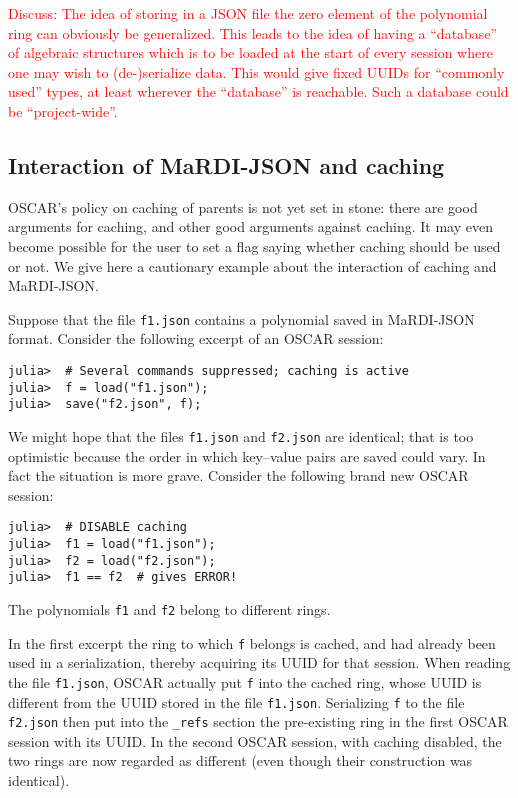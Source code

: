 \documentclass{article}
\newcommand{\MaRDIJSON}{MaRDI-JSON}
\def\red#1{\textcolor{red}{#1}}
\begin{document}
\red{Discuss: The idea of storing in a JSON file the zero element of the
  polynomial ring can obviously be generalized.  This leads to the
  idea of having a ``database'' of algebraic structures which is to be
  loaded at the start of every session where one may wish to
  (de-)serialize data.  This would give fixed UUIDs for
  ``commonly used'' types, at least wherever the ``database'' is
  reachable.  Such a database could be ``project-wide''.}


\subsection{Interaction of {\MaRDIJSON} and caching}
\label{sec:InteractionWithCaching}

OSCAR's policy on caching of parents is not yet set in stone:
there are good arguments for caching, and other good arguments
against caching.  It may even become possible for the user to
set a flag saying whether caching should be used or not.  We
give here a cautionary example about the interaction of caching
and {\MaRDIJSON}.

Suppose that the file \verb|f1.json| contains a polynomial
saved in {\MaRDIJSON} format.  Consider the following excerpt
of an OSCAR session:
\begin{verbatim}
julia>  # Several commands suppressed; caching is active
julia>  f = load("f1.json");
julia>  save("f2.json", f);
\end{verbatim}
We might hope that the files \verb|f1.json| and \verb|f2.json|
are identical; that is too optimistic because the order in which
key--value pairs are saved could vary.  In fact the situation is
more grave.  Consider the following brand new OSCAR session:
\begin{verbatim}
julia>  # DISABLE caching
julia>  f1 = load("f1.json");
julia>  f2 = load("f2.json");
julia>  f1 == f2  # gives ERROR!
\end{verbatim}
The polynomials \verb|f1| and \verb|f2| belong to different rings.

In the first excerpt the ring to which \verb|f| belongs is cached,
and had already been used in a serialization, thereby acquiring its
UUID for that session.  When reading the file \verb|f1.json|,
OSCAR actually put \verb|f| into the cached ring, whose UUID is
different from the UUID stored in the file \verb|f1.json|.  Serializing
\verb|f| to the file \verb|f2.json| then put into the \verb|_refs|
section the pre-existing ring in the first OSCAR session with its UUID.
In the second OSCAR session, with caching disabled, the two rings
are now regarded as different (even though their construction was
identical).
\end{document}
